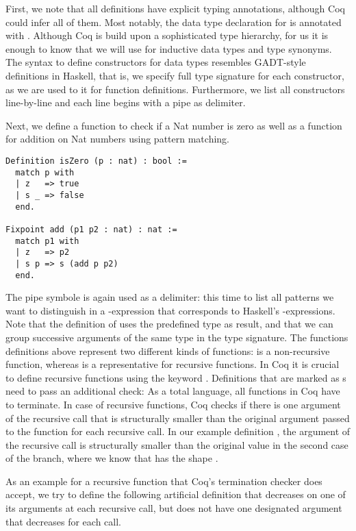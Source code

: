 First, we note that all definitions have explicit typing annotations, although Coq could infer all of them.
Most notably, the data type declaration for  is annotated with .
Although Coq is build upon a sophisticated type hierarchy, for us it is enough to know that we will use  for inductive data types and type synonyms.
The syntax to define constructors for data types resembles GADT-style definitions in Haskell, that is, we specify full type signature for each constructor, as we are used to it for function definitions.
Furthermore, we list all constructors line-by-line and each line begins with a pipe \cinl{|} as delimiter.

Next, we define a function to check if a Nat number is zero as well as a function for addition on Nat numbers using pattern matching.

\begin{verbatim}
Definition isZero (p : nat) : bool :=
  match p with
  | z   => true
  | s _ => false
  end.

Fixpoint add (p1 p2 : nat) : nat :=
  match p1 with
  | z   => p2
  | s p => s (add p p2)
  end.
\end{verbatim}

The pipe symbole \cinl{|} is again used as a delimiter: this time to list all patterns we want to distinguish in a -expression that corresponds to Haskell's -expressions.
Note that the definition of  uses the predefined  type as result, and that we can group successive arguments of the same type in the type signature.
The functions definitions above represent two different kinds of functions:  is a non-recursive function, whereas  is a representative for recursive functions.
In Coq it is crucial to define recursive functions using the keyword .
Definitions that are marked as s need to pass an additional check: As a total language, all functions in Coq have to terminate.
In case of recursive functions, Coq checks if there is one argument of the recursive call that is structurally smaller than the original argument passed to the function for each recursive call.
In our example definition , the argument  of the recursive call is structurally smaller than the original value  in the second case of the branch, where we know that  has the shape .

As an example for a recursive function that Coq's termination checker does accept, we try to define the following artificial definition that decreases on one of its arguments at each recursive call, but does not have one designated argument that decreases for each call.

